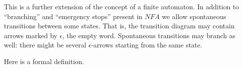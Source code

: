 

\setcounter{section}{1}
\setcounter{subsection}{4}
\setcounter{dfn}{11}

This is a further extension of the concept of a finite automaton.
In addition to ``branching'' and ``emergency stops'' present in $NFA$
we allow spontaneous transitions between some states.
That is, the transition diagram may contain arrows marked by $\epsilon$, the empty word.
Spontaneous transitions may branch as well: there might be several $\epsilon$-arrows starting from the same state.

Here is a formal definition.


